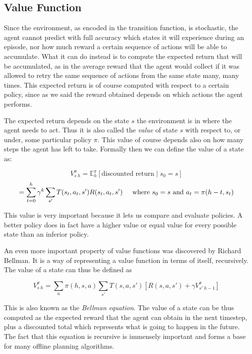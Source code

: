 \subsection{Value Function}

Since the environment, as encoded in the transition function, is stochastic, the agent cannot
predict with full accuracy which states it will experience during an episode, nor how much reward a
certain sequence of actions will be able to accumulate. What it can do instead is to compute the
expected return that will be accumulated, as in the average reward that the agent would collect if
it was allowed to retry the same sequence of actions from the same state many, many times. This
expected return is of course computed with respect to a certain policy, since as we said the reward
obtained depends on which actions the agent performs.

The expected return depends on the state $s$ the environment is in where the agent needs to act.
Thus it is also called the \textit{value} of state $s$ with respect to, or under, some particular
policy $\pi$. This value of course depends also on how many steps the agent has left to take.
Formally then we can define the value of a state as:

\[ V^\pi_{s\:h} = \mathbb{E}^\pi_h \left [\text{discounted return} \mid s_0 = s \right ] \]
\[ = \sum_{t=0}^{h} \gamma^k \sum_{s'} T(s_t, a_t, s')
             R(s_{t}, a_t, s') \hspace{0.5cm}\text{where }s_0 = s \text{ and }a_t = \pi(h-t,
             s_t) \]

This value is very important because it lets us compare and evaluate policies. A better policy does
in fact have a higher value or equal value for every possible state than an inferior policy.

An even more important property of value functions was discovered by Richard Bellman. It is a way of
representing a value function in terms of itself, recursively. The value of a state can thus be
defined as

\[ V^{\pi}_{s\:h} = \sum_a \pi(h, s, a) \sum_{s'} T(s, a, s') \left [ R(s, a, s') + \gamma
V^{\pi}_{s'\:h-1} \right ] \]

This is also known as the \textit{Bellman equation}. The value of a state can be thus computed as
the expected reward that the agent can obtain in the next timestep, plus a discounted total which
represents what is going to happen in the future. The fact that this equation is recursive is
immensely important and forms a base for many offline planning algorithms.

